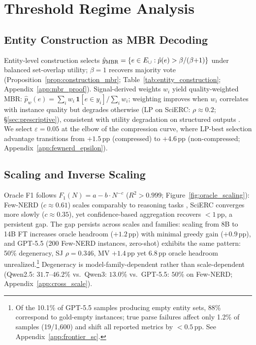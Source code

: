 \section{Threshold Regime Analysis}\label{sec:theory_scaling}

\subsection{Entity Construction as MBR Decoding}\label{sec:mbr_theory}

Entity-level construction selects $\hat{y}_{\textup{MBR}} = \{e \in E_\cup : \hat{p}(e) > \beta/(\beta{+}1)\}$ under balanced set-overlap utility; $\beta{=}1$ recovers majority vote (Proposition~\ref{prop:construction_mbr}; Table~\ref{tab:entity_construction}; Appendix~\ref{app:mbr_proof}).
Signal-derived weights $w_i$ yield quality-weighted MBR: $\hat{p}_w(e) = \sum_{i} w_i \, \mathbf{1}[e {\in} y_i] / \sum_{i} w_i$; weighting improves when $w_i$ correlates with instance quality but degrades otherwise (LP on SciERC: $\rho{\approx}0.2$; \S\ref{sec:prescriptive}), consistent with utility degradation on structured outputs \cite{eikema2025structured}.
We select $\varepsilon{=}0.05$ at the elbow of the compression curve, where LP-best selection advantage transitions from $+1.5$\,pp (compressed) to $+4.6$\,pp (non-compressed; Appendix~\ref{app:fewnerd_epsilon}).

\subsection{Scaling and Inverse Scaling}\label{sec:scaling}

Oracle F1 follows $F_1(N) = a - b \cdot N^{-c}$ ($R^2 > 0.999$; Figure~\ref{fig:oracle_scaling}): Few-NERD ($c{\approx}0.61$) scales comparably to reasoning tasks \cite{brown2024monkeys}, SciERC converges more slowly ($c{\approx}0.35$), yet confidence-based aggregation recovers ${<}1$\,pp, a persistent gap.
The gap persists across scales and families: scaling from 8B to 14B FT increases oracle headroom ($+1.2$\,pp) with minimal greedy gain ($+0.9$\,pp), and GPT-5.5 (200 Few-NERD instances, zero-shot) exhibits the same pattern: 50\% degeneracy, SJ $\rho{=}0.346$, MV $+1.4$\,pp yet 6.8\,pp oracle headroom unrealized.\footnote{Of the 10.1\% of GPT-5.5 samples producing empty entity sets, 88\% correspond to gold-empty instances; true parse failures affect only 1.2\% of samples (19/1{,}600) and shift all reported metrics by ${<}0.5$\,pp. See Appendix~\ref{app:frontier_sc}.}
Degeneracy is model-family-dependent rather than scale-dependent (Qwen2.5: $31.7$--$46.2$\% vs.\ Qwen3: $13.0$\% vs.\ GPT-5.5: $50$\% on Few-NERD; Appendix~\ref{app:cross_scale}).

